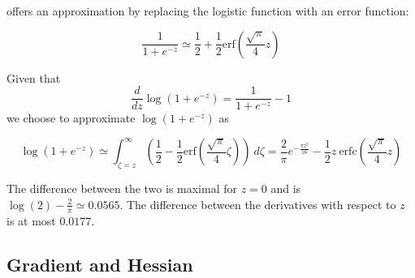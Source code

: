 \documentclass[12pt]{article}
\begin{document}
\cite{crooks2009logistic} offers an approximation by replacing the logistic function with an error function:

$$\frac{1}{1+e^{-z}} \simeq \frac{1}{2} + \frac{1}{2} \text{erf}\left(\frac{\sqrt{\pi}}{4} z\right)$$

Given that $$\frac{d}{d z}\log\left(1 + e^{-z}\right) = \frac{1}{1 + e^{-z}} - 1$$ we choose to approximate $\log\left(1 + e^{-z}\right)$
as

$$\log\left(1 + e^{-z}\right) \simeq \int_{\zeta=z}^{\infty} \left(\frac{1}{2} - \frac{1}{2} \text{erf}\left(\frac{\sqrt{\pi}}{4} \zeta \right)\right)~d\zeta =
\frac{2}{\pi}e^{-\frac{\pi z^2}{16}} - \frac{1}{2} z~\mathrm{erfc}\left(\frac{\sqrt{\pi}}{4} z\right)$$

The difference between the two is maximal for $z = 0$ and is $\log(2) - \frac{2}{\pi} \simeq 0.0565$. The difference between the derivatives with respect to $z$ is at most $0.0177$.



\subsection{Gradient and Hessian}


\printbibliography
\end{document}

